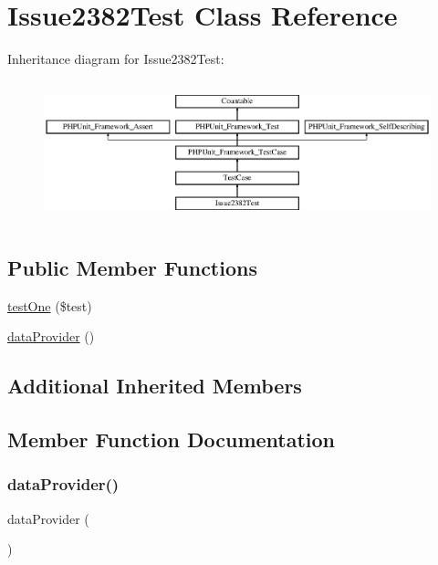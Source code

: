 \hypertarget{class_issue2382_test}{}\section{Issue2382\+Test Class Reference}
\label{class_issue2382_test}
Inheritance diagram for Issue2382\+Test\+:\begin{figure}[H]
\begin{center}
\leavevmode
\includegraphics[height=4.129793cm]{class_issue2382_test}
\end{center}
\end{figure}
\subsection*{Public Member Functions}
\begin{DoxyCompactItemize}
\item 
\mbox{\hyperlink{class_issue2382_test_ae1b63de806858f5a0ef98ac08d0d92ef}{test\+One}} (\$test)
\item 
\mbox{\hyperlink{class_issue2382_test_a5b640f9874e358f482cc4135fcb88ab7}{data\+Provider}} ()
\end{DoxyCompactItemize}
\subsection*{Additional Inherited Members}


\subsection{Member Function Documentation}
\mbox{\label{class_issue2382_test_a5b640f9874e358f482cc4135fcb88ab7}} 
\subsubsection{\texorpdfstring{data\+Provider()}{dataProvider()}}
{\footnotesize\ttfamily data\+Provider (\begin{DoxyParamCaption}{ }\end{DoxyParamCaption})}

